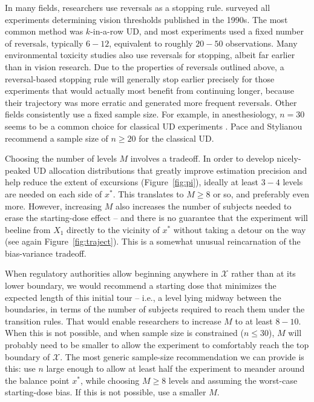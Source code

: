 In many fields, researchers use reversals as a stopping rule. \cite{Garc:Pere:Forc:1998} surveyed all experiments determining vision thresholds published in the 1990s. The most common method was $k$-in-a-row UD, and most experiments used a fixed number of reversals, typically $6-12$, equivalent to roughly $20-50$ observations. Many environmental toxicity studies also use reversals for stopping, albeit far earlier than in vision research. Due to the properties of reversals outlined above, a reversal-based stopping rule will generally stop earlier precisely for those experiments that would actually most benefit from continuing longer, because their trajectory was more erratic and generated more frequent reversals. Other fields consistently use a fixed sample size. For example, in anesthesiology, $n=30$ seems to be a common choice for classical UD experiments \citep{Capo:Parp:Lyon:Colu:Cell:Mini:2001,Camo:Capo:Lyon:Colu:Epid:2004}. Pace and Stylianou \citep{Pace:styl:tutor:2007} recommend a sample size of $n\geq 20$ for the classical UD.

Choosing the number of levels $M$ involves a tradeoff. In order to develop nicely-peaked UD allocation distributions that greatly improve estimation precision and help reduce the extent of excursions (Figure~\ref{fig:pi}), ideally at least $3-4$ levels are needed on each side of $x^*$. This translates to $M\geq 8$ or so, and preferably even more. However, increasing $M$ also increases the number of subjects needed to erase the starting-dose effect -- and there is no guarantee that the experiment will beeline from $X_1$ directly to the vicinity of $x^*$ without taking a detour on the way (see again Figure~\ref{fig:traject}).  This is a somewhat unusual reincarnation of the bias-variance tradeoff.

When regulatory authorities allow beginning anywhere in $\mathcal{X}$ rather than at its lower boundary, we would recommend a starting dose that minimizes the expected length of this initial tour -- i.e., a level lying midway between the boundaries, in terms of the number of subjects required to reach them under the transition rules. That would enable researchers to increase $M$ to at least $8-10$. When this is not possible, and when sample size is constrained ($n\leq 30$), $M$ will probably need to be smaller to allow the experiment to comfortably reach the top boundary of $\mathcal{X}$. The most generic sample-size recommendation we can provide is this: use $n$ large enough to allow at least half the experiment to meander around the balance point $x^*$, while choosing $M\geq 8$ levels and assuming the worst-case starting-dose bias. If this is not possible, use a smaller $M$.

